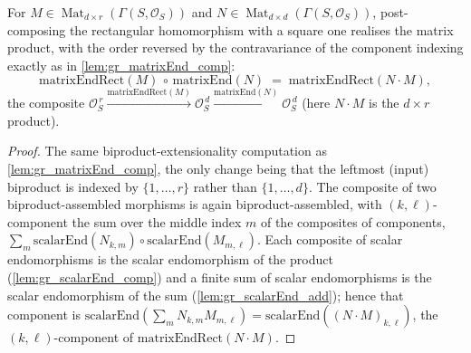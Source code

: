 \begin{lemma}


  \label{lem:gr_matrixEndRect_comp}
  For \(M \in \operatorname{Mat}_{d\times r}(\Gamma(S,\mathcal{O}_S))\) and
  \(N \in \operatorname{Mat}_{d\times d}(\Gamma(S,\mathcal{O}_S))\), post-composing the
  rectangular homomorphism with a square one realises the matrix product, with the order
  reversed by the contravariance of the component indexing exactly as in
  \cref{lem:gr_matrixEnd_comp}:
  \[
    \mathrm{matrixEndRect}(M) \,\circ\, \mathrm{matrixEnd}(N)
      \;=\; \mathrm{matrixEndRect}(N \cdot M),
  \]
  the composite \(\mathcal{O}_S^{\,r} \xrightarrow{\mathrm{matrixEndRect}(M)}
  \mathcal{O}_S^{\,d} \xrightarrow{\mathrm{matrixEnd}(N)} \mathcal{O}_S^{\,d}\) (here
  \(N \cdot M\) is the \(d \times r\) product).
\end{lemma}
\begin{proof}
    \leanok
  The same biproduct-extensionality computation as \cref{lem:gr_matrixEnd_comp}, the only
  change being that the leftmost (input) biproduct is indexed by \(\{1,\dots,r\}\) rather
  than \(\{1,\dots,d\}\). The composite of two biproduct-assembled morphisms is again
  biproduct-assembled, with \((k,\ell)\)-component the sum over the middle index \(m\) of the
  composites of components, \(\sum_m \mathrm{scalarEnd}(N_{k,m}) \circ
  \mathrm{scalarEnd}(M_{m,\ell})\). Each composite of scalar endomorphisms is the scalar
  endomorphism of the product (\cref{lem:gr_scalarEnd_comp}) and a finite sum of scalar
  endomorphisms is the scalar endomorphism of the sum (\cref{lem:gr_scalarEnd_add}); hence
  that component is \(\mathrm{scalarEnd}(\sum_m N_{k,m} M_{m,\ell}) =
  \mathrm{scalarEnd}((N\cdot M)_{k,\ell})\), the \((k,\ell)\)-component of
  \(\mathrm{matrixEndRect}(N\cdot M)\).
\end{proof}

